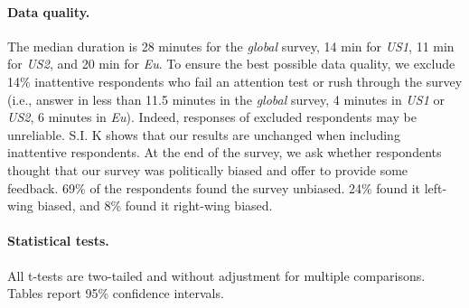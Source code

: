 \begin{small}
\paragraph{\small Data quality.} %
The median duration is 28 minutes for the \textit{global} survey, 14 min for \textit{US1}, 11 min for \textit{US2}, and 20 min for \textit{Eu}. To ensure the best possible data quality, we exclude 14\% inattentive respondents who fail an attention test or rush through the survey (i.e., answer in less than 11.5 minutes in the \textit{global} survey, 4 minutes in \textit{US1} or \textit{US2}, 6 minutes in \textit{Eu}). Indeed, responses of excluded respondents may be unreliable. S.I. K 
shows that our results are unchanged when including inattentive respondents. %
At the end of the survey, we ask whether respondents thought that our survey was politically biased and offer to provide some feedback. 69\% of the respondents found the survey unbiased. 24\% found it left-wing biased, and 8\% found it right-wing biased.

\paragraph{\small Statistical tests.}
All t-tests are two-tailed and without adjustment for multiple comparisons. Tables report 95\% confidence intervals. 


\end{small}
